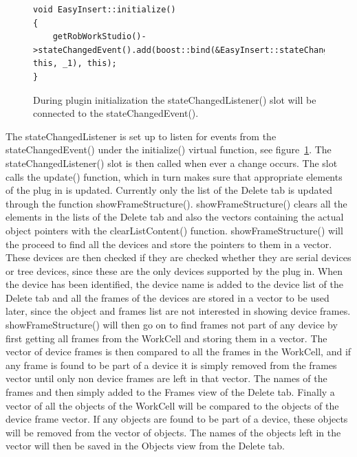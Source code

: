 \begin{figure}[h] %
\centering
\lstset{language=C++} 
\begin{lstlisting}[frame=single] 
void EasyInsert::initialize()
{
    getRobWorkStudio()->stateChangedEvent().add(boost::bind(&EasyInsert::stateChangedListener, this, _1), this);
}
\end{lstlisting}
\caption{During plugin initialization the stateChangedListener() slot will be connected to the stateChangedEvent().}
\label{fig:eiStateChangedListener} 	
\end{figure}

The stateChangedListener is set up to listen for events from the stateChangedEvent() under the initialize() virtual function, see figure~\ref{fig:eiStateChangedListener}. The stateChangedListener() slot is then called when ever a change occurs. The slot calls the update() function, which in turn makes sure that appropriate elements of the plug in is updated. Currently only the list of the Delete tab is updated through the function showFrameStructure(). showFrameStructure() clears all the elements in the lists of the Delete tab and also the vectors containing the actual object pointers with the clearListContent() function. showFrameStructure() will the proceed to find all the devices and store the pointers to them in a vector. These devices are then checked if they are checked whether they are serial devices or tree devices, since these are the only devices supported by the plug in. When the device has been identified, the device name is added to the device list of the Delete tab and all the frames of the devices are stored in a vector to be used later, since the object and frames list are not interested in showing device frames. 
showFrameStructure() will then go on to find frames not part of any device by first getting all frames from the WorkCell and storing them in a vector. The vector of device frames is then compared to all the frames in the WorkCell, and if any frame is found to be part of a device it is simply removed from the frames vector until only non device frames are left in that vector. The names of the frames and then simply added to the Frames view of the Delete tab.
Finally a vector of all the objects of the WorkCell will be compared to the objects of the device frame vector. If any objects are found to be part of a device, these objects will be removed from the vector of objects. The names of the objects left in the vector will then be saved in the Objects view from the Delete tab. 


